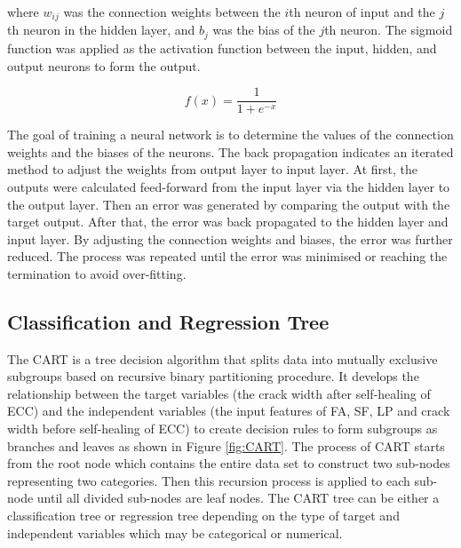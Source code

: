 \documentclass[11pt]{article}
\begin{document}
	where $w_{ij}$ was the connection weights between the $i$th neuron of input and the $j$th neuron in the hidden layer, and $b_j$ was the bias of the $j$th neuron. The sigmoid function was applied as the activation function between the input, hidden, and output neurons to form the output. 
	
	\begin{equation}
	f(x) = \frac{1}{1+e^{-x}}
	\end{equation}
	
	The goal of training a neural network is to determine the values of the connection weights and the biases of the neurons. The back propagation indicates an iterated method to adjust the weights from output layer to input layer. At first, the outputs were calculated feed-forward from the input layer via the hidden layer to the output layer. Then an error was generated by comparing the output with the target output. After that, the error was back propagated to the hidden layer and input layer. By adjusting the connection weights and biases, the error was further reduced. The process was repeated until the error was minimised or reaching the termination to avoid over-fitting. 
	
	\subsection{Classification and Regression Tree}
		The CART \cite{breiman2017classification}  is a tree decision algorithm that splits data into mutually exclusive subgroups based on recursive binary partitioning procedure. It develops the relationship between the target variables (the crack width after self-healing of ECC) and the independent variables (the input features of FA, SF, LP and crack width before self-healing of ECC) to create decision rules to form subgroups as branches and leaves as shown in Figure \ref{fig:CART}. The process of CART starts from the root node which contains the entire data set to construct two sub-nodes representing two categories. Then this recursion process is applied to each sub-node until all divided sub-nodes are leaf nodes. The CART tree can be either a classification tree \cite{dan1995cart} or regression tree \cite{put2003classification} depending on the type of target and independent variables which may be categorical or numerical. 
	
\end{document}
